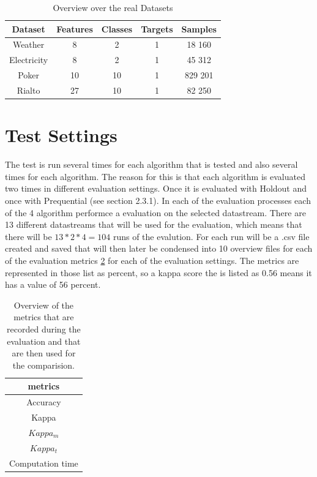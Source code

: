 \documentclass[12pt,oneside,a4paper,parskip]{scrbook}
\begin{document}
\begin{table}[H]
  \label{tab:realdata}
  \centering
  \begin{tabular} {|| c c c c c ||} 
    \hline
      Dataset & Features & Classes & Targets & Samples \\
    \hline\hline
      Weather & 8 & 2 & 1 & 18 160 \\
    \hline 
      Electricity & 8 & 2 & 1 & 45 312 \\
    \hline
      Poker & 10 & 10 & 1 & 829 201 \\
    \hline
      Rialto & 27 & 10 & 1 & 82 250 \\
    \hline
  \end{tabular} 
  \caption{Overview over the real Datasets}
\end{table}

\section{Test Settings}

The test is run several times for each algorithm that is tested and also several times for each algorithm.
The reason for this is that each algorithm is evaluated two times in different evaluation settings.
Once it is evaluated with Holdout and once with Prequential (see section 2.3.1).
In each of the evaluation processes each of the 4 algorithm performce a evaluation on the selected datastream.
There are 13 different datastreams that will be used for the evaluation, which means that there will be $13*2*4=104$ 
runs of the evalution.
For each run will be a .csv file created and saved that will then later be condensed into 10 overview files for each of the 
evaluation metrics \ref{tab:metrics} for each of the evaluation settings.
The metrics are represented in those list as percent, so a kappa score the is listed as 0.56 means it has a value of 56 percent.

\begin{table}[H]
  \centering
    \begin{tabular} {|| c ||} 
      \hline
        metrics \\
      \hline\hline
        Accuracy  \\
      \hline 
        Kappa  \\
      \hline
        $Kappa_m$  \\
      \hline
        $Kappa_t$  \\
      \hline
        Computation time  \\
      \hline
    \end{tabular} 
  \caption{Overview of the metrics that are recorded during the evaluation and that are then used for the comparision.}
  \label{tab:metrics}
\end{table}
\end{document}
